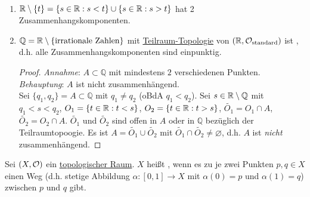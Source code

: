 \begin{example}
  \
  \begin{enumerate}
    \item $ \mathbb{R} \setminus \{ t \} = \{ s \in \mathbb{R} : s < t \} \cup \{ s \in \mathbb{R} : s > t \} $ hat 2 Zusammenhangskomponenten.
    \item $ \mathbb{Q} = \mathbb{R} \setminus \{ \text{irrationale Zahlen} \} $ mit \hyperref[def:teilraumtopologie]{Teilraum-Topologie} von $ (\mathbb{R}, \mathcal{O}_\text{standard}) $ ist , d.h. alle Zusammenhangskomponenten sind einpunktig. \\
    \begin{proof}
      \emph{Annahme}: $ A \subset \mathbb{Q} $ mit mindestens $ 2 $ verschiedenen Punkten. \\
      \emph{Behauptung}: $ A $ ist nicht zusammenhängend. \\
      Sei $ \{ q_1, q_2 \} = A \subset \mathbb{Q} $ mit $ q_1 \neq q_2 $ (oBdA $ q_1 < q_2 $). Sei $ s \in \mathbb{R} \setminus \mathbb{Q} $ mit $ q_1 < s < q_2 $, $ O_1 = \{ t \in \mathbb{R}: t < s \} $, $ O_2 = \{ t \in \mathbb{R} : t > s \} $, $ \widetilde{O_1} = O_1 \cap A $, $ \widetilde{O_2} = O_2 \cap A $. $ \widetilde{O_1} $ und $ \widetilde{O_2} $ sind offen in $ A $ oder in $ \mathbb{Q} $ bezüglich der Teilraumtopoogie. Es ist $ A = \widetilde{O_1} \cup \widetilde{O_2} $ mit $ \widetilde{O_1} \cap \widetilde{O_2} \neq \varnothing $, d.h. $ A $ ist \emph{nicht} zusammenhängend.
    \end{proof}
  \end{enumerate}
\end{example}

\begin{definition}
  \label{def:wegzusammenhaengend}
  Sei $ (X, \mathcal{O}) $ ein \hyperref[def:topologie]{topologischer Raum}. $ X $ heißt , wenn es zu je zwei Punkten $ p, q \in X $ einen Weg (d.h. stetige Abbildung $ \alpha : [0,1] \to X $ mit $ \alpha(0) = p $ und $ \alpha(1) = q $) zwischen $ p $ und $ q $ gibt.
\end{definition}

